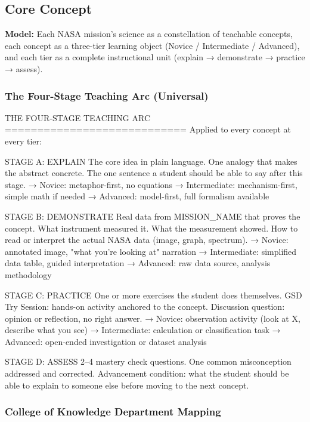 \documentclass[11pt,letterpaper]{article}
\begin{document}
\subsection{Core Concept}

\textbf{Model:} Each NASA mission's science as a constellation of teachable concepts, each concept as a three-tier learning object (Novice / Intermediate / Advanced), and each tier as a complete instructional unit (explain → demonstrate → practice → assess).

\subsubsection{The Four-Stage Teaching Arc (Universal)}

\begin{asciibox}
THE FOUR-STAGE TEACHING ARC
============================
Applied to every concept at every tier:

STAGE A: EXPLAIN
  The core idea in plain language.
  One analogy that makes the abstract concrete.
  The one sentence a student should be able to say after this stage.
  → Novice: metaphor-first, no equations
  → Intermediate: mechanism-first, simple math if needed
  → Advanced: model-first, full formalism available

STAGE B: DEMONSTRATE
  Real data from {MISSION_NAME} that proves the concept.
  What instrument measured it. What the measurement showed.
  How to read or interpret the actual NASA data (image, graph, spectrum).
  → Novice: annotated image, "what you're looking at" narration
  → Intermediate: simplified data table, guided interpretation
  → Advanced: raw data source, analysis methodology

STAGE C: PRACTICE
  One or more exercises the student does themselves.
  GSD Try Session: hands-on activity anchored to the concept.
  Discussion question: opinion or reflection, no right answer.
  → Novice: observation activity (look at X, describe what you see)
  → Intermediate: calculation or classification task
  → Advanced: open-ended investigation or dataset analysis

STAGE D: ASSESS
  2–4 mastery check questions.
  One common misconception addressed and corrected.
  Advancement condition: what the student should be able to
  explain to someone else before moving to the next concept.
\end{asciibox}

\subsubsection{College of Knowledge Department Mapping}
\end{document}
